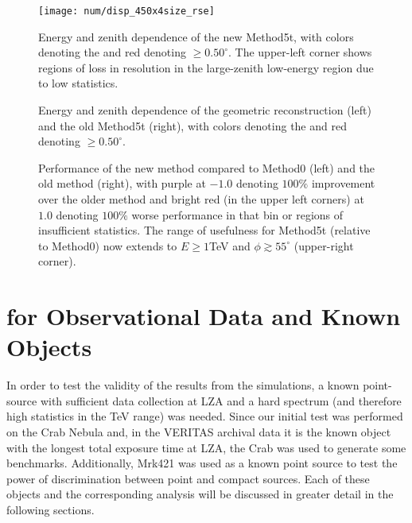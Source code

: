 \documentclass[main.tex]{subfiles}
\begin{document}
\begin{figure}[htbp]
  \centering
  \texttt{[image: num/disp\_450x4size\_rse]}
  \caption[Energy and zenith dependence of the new Method5t.]{Energy and zenith dependence of the new Method5t, with colors denoting the \rse and red denoting \rse$\geq0.50^\circ$. The upper-left corner shows regions of loss in resolution in the large-zenith low-energy region due to low statistics.}
  \label{fig:energy_new_contour}
\end{figure}

\begin{figure}[htbp]
  \centering
  \caption[Energy and zenith dependence of Method0 and the old Method5t]{Energy and zenith dependence of the geometric reconstruction (left) and the old Method5t (right), with colors denoting the \rse and red denoting \rse$\geq0.50^\circ$.}
  \label{fig:energy_contour}
\end{figure}

\begin{figure}[htbp]
  \centering
  \caption[Performance of the new \disp method compared to Method0 and the old \disp method]{Performance of the new \disp method compared to Method0 (left) and the old \disp method (right), with purple at $-1.0$ denoting $100\%$ improvement over the older method and bright red (in the upper left corners) at $1.0$ denoting $100\%$ worse performance in that bin or regions of insufficient statistics. The range of usefulness for Method5t (relative to Method0) now extends to $E\geq1$TeV and $\phi\gtrsim55^\circ$ (upper-right corner).}
  \label{fig:energy_rel}
\end{figure}

\section{\rse for Observational Data and Known Objects}
In order to test the validity of the results from the simulations, a known point-source with sufficient data collection at LZA and a hard spectrum (and therefore high statistics in the TeV range) was needed. Since our initial test was performed on the Crab Nebula and, in the VERITAS archival data it is the known object with the longest total exposure time at LZA, the Crab was used to generate some benchmarks. Additionally, Mrk421 was used as a known point source to test the power of discrimination between point and compact sources. Each of these objects and the corresponding analysis will be discussed in greater detail in the following sections.
\end{document}
